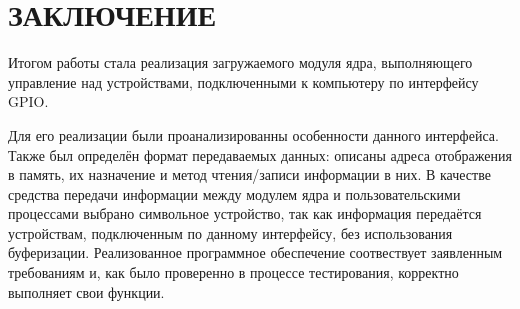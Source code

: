 \section*{ЗАКЛЮЧЕНИЕ}

Итогом работы стала реализация загружаемого модуля ядра, выполняющего управление над устройствами, подключенными к компьютеру по интерфейсу GPIO. 

Для его реализации были проанализированны особенности данного интерфейса. Также был определён формат передаваемых данных: описаны адреса отображения в память, их назначение и метод чтения/записи информации в них. В качестве средства передачи информации между модулем ядра и пользовательскими процессами выбрано символьное устройство, так как информация передаётся устройствам, подключенным по данному интерфейсу, без использования буферизации. Реализованное программное обеспечение соотвествует заявленным требованиям и, как было проверенно в процессе тестирования, корректно выполняет свои функции.

\pagebreak